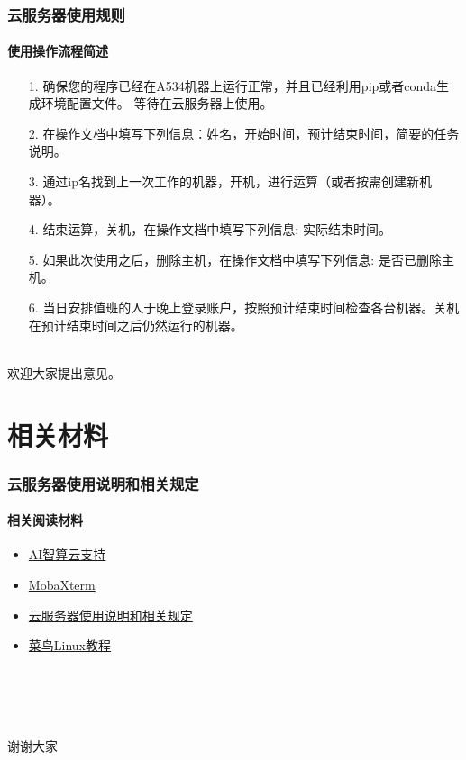 \documentclass[10pt]{beamer}
\begin{document}
        \begin{frame}
            \frametitle{云服务器使用规则}
                \framesubtitle{使用操作流程简述}
                    \begin{itemize}
                        \item [1. ]{确保您的程序已经在A534机器上运行正常，并且已经利用pip或者conda生成环境配置文件。 等待在云服务器上使用。}
                        \item [2. ]{在操作文档中填写下列信息：姓名，开始时间，预计结束时间，简要的任务说明。}
                        \item [3. ]{通过ip名找到上一次工作的机器，开机，进行运算（或者按需创建新机器）。}
                        \item [4. ]{结束运算，关机，在操作文档中填写下列信息: 实际结束时间。}
                        \item [5. ]{如果此次使用之后，删除主机，在操作文档中填写下列信息: 是否已删除主机。}
                        \item [6. ]{当日安排值班的人于晚上登录账户，按照预计结束时间检查各台机器。关机在预计结束时间之后仍然运行的机器。}
                    \end{itemize}
                    \hspace*{\fill}\\
                    \centering
                    {\large 欢迎大家提出意见。}

        \end{frame}

    \section{相关材料}
        \begin{frame}
            \frametitle{云服务器使用说明和相关规定}
                \framesubtitle{相关阅读材料}
                \begin{itemize}
                    \item \href{https://ai.blsc.cn/\#/support/info}{AI智算云支持} \\
                    \item \href{https://mobaxterm.mobatek.net}{MobaXterm} \\
                    \item \href{https://github.com/Ls-Dai/Cloud-Sever-Tutorial}{云服务器使用说明和相关规定} \\
                    \item \href{https://www.runoob.com/linux/linux-tutorial.html}{菜鸟Linux教程} \\
                \end{itemize}
                \hspace*{\fill} \\
                \hspace*{\fill} \\
                \hspace*{\fill} \\
                \hspace*{\fill} \\
                \centering
                {\huge 谢谢大家}
        \end{frame}
\end{document}

